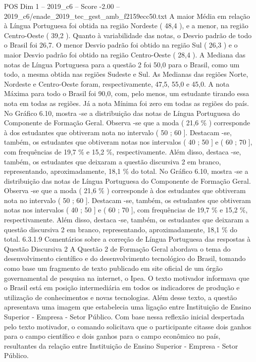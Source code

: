 \begin{textsample}{POS Dim 1 – 2019\_c6 – Score -2.00 – 2019\_c6/enade\_2019\_tec\_gest\_amb\_f2159ecc50.txt}
A maior Média em relação à Língua Portuguesa foi obtida na região Nordeste ( 48,4 ), e a menor, na região Centro-Oeste ( 39,2 ).
Quanto à variabilidade das notas, o Desvio padrão de todo o Brasil foi 26,7.
O menor Desvio padrão foi obtido na região Sul ( 26,3 ) e o maior Desvio padrão foi obtido na região Centro-Oeste ( 28,4 ).
A Mediana das notas de Língua Portuguesa para a questão 2 foi 50,0 para o Brasil, como um todo, a mesma obtida nas regiões Sudeste e Sul.
As Medianas das regiões Norte, Nordeste e Centro-Oeste foram, respectivamente, 47,5, 55,0 e 45,0.
A nota Máxima para todo o Brasil foi 90,0, com, pelo menos, um estudante tirando essa nota em todas as regiões.
Já a nota Mínima foi zero em todas as regiões do país.
No Gráfico 6.10, mostra -se a distribuição das notas de Língua Portuguesa do Componente de Formação Geral.
Observa -se que a moda ( 21,6 \% ) corresponde à dos estudantes que obtiveram nota no intervalo ( 50 ; 60 ].
Destacam -se, também, os estudantes que obtiveram notas nos intervalos ( 40 ; 50 ] e ( 60 ; 70 ], com frequências de 19,7 \% e 15,2 \%, respectivamente.
Além disso, destaca -se, também, os estudantes que deixaram a questão discursiva 2 em branco, representando, aproximadamente, 18,1 \% do total.
No Gráfico 6.10, mostra -se a distribuição das notas de Língua Portuguesa do Componente de Formação Geral.
Observa -se que a moda ( 21,6 \% ) corresponde à dos estudantes que obtiveram nota no intervalo ( 50 ; 60 ].
Destacam -se, também, os estudantes que obtiveram notas nos intervalos ( 40 ; 50 ] e ( 60 ; 70 ], com frequências de 19,7 \% e 15,2 \%, respectivamente.
Além disso, destaca -se, também, os estudantes que deixaram a questão discursiva 2 em branco, representando, aproximadamente, 18,1 \% do total. 6.3.1.9 Comentários sobre a correção de Língua Portuguesa das respostas à Questão Discursiva 2 A Questão 2 de Formação Geral abordava o tema do desenvolvimento científico e do desenvolvimento tecnológico do Brasil, tomando como base um fragmento de texto publicado em site oficial de um órgão governamental de pesquisa na internet, o Ipea.
O texto motivador informava que o Brasil está em posição intermediária em todos os indicadores de produção e utilização de conhecimentos e novas tecnologias.
Além desse texto, a questão apresentava uma imagem que estabelecia uma ligação entre Instituição de Ensino Superior - Empresa - Setor Público.
Com base nessa reflexão inicial despertada pelo texto motivador, o comando solicitava que o participante citasse dois ganhos para o campo científico e dois ganhos para o campo econômico no país, resultantes da relação entre Instituição de Ensino Superior - Empresa - Setor Público.

\end{textsample}
